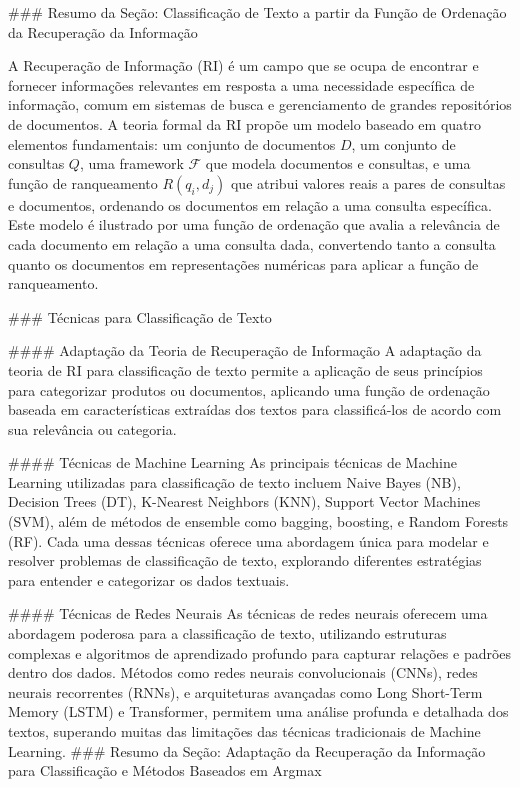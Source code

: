 {### Resumo da Seção: Classificação de Texto a partir da Função de Ordenação da Recuperação da Informação

A Recuperação de Informação (RI) é um campo que se ocupa de encontrar e fornecer informações relevantes em resposta a uma necessidade específica de informação, comum em sistemas de busca e gerenciamento de grandes repositórios de documentos. A teoria formal da RI propõe um modelo baseado em quatro elementos fundamentais: um conjunto de documentos \(D\), um conjunto de consultas \(Q\), uma framework \(\mathcal{F}\) que modela documentos e consultas, e uma função de ranqueamento \(R(q_i, d_j)\) que atribui valores reais a pares de consultas e documentos, ordenando os documentos em relação a uma consulta específica. Este modelo é ilustrado por uma função de ordenação que avalia a relevância de cada documento em relação a uma consulta dada, convertendo tanto a consulta quanto os documentos em representações numéricas para aplicar a função de ranqueamento.

### Técnicas para Classificação de Texto

#### Adaptação da Teoria de Recuperação de Informação
A adaptação da teoria de RI para classificação de texto permite a aplicação de seus princípios para categorizar produtos ou documentos, aplicando uma função de ordenação baseada em características extraídas dos textos para classificá-los de acordo com sua relevância ou categoria.

#### Técnicas de Machine Learning
As principais técnicas de Machine Learning utilizadas para classificação de texto incluem Naive Bayes (NB), Decision Trees (DT), K-Nearest Neighbors (KNN), Support Vector Machines (SVM), além de métodos de ensemble como bagging, boosting, e Random Forests (RF). Cada uma dessas técnicas oferece uma abordagem única para modelar e resolver problemas de classificação de texto, explorando diferentes estratégias para entender e categorizar os dados textuais.

#### Técnicas de Redes Neurais
As técnicas de redes neurais oferecem uma abordagem poderosa para a classificação de texto, utilizando estruturas complexas e algoritmos de aprendizado profundo para capturar relações e padrões dentro dos dados. Métodos como redes neurais convolucionais (CNNs), redes neurais recorrentes (RNNs), e arquiteturas avançadas como Long Short-Term Memory (LSTM) e Transformer, permitem uma análise profunda e detalhada dos textos, superando muitas das limitações das técnicas tradicionais de Machine Learning.
### Resumo da Seção: Adaptação da Recuperação da Informação para Classificação e Métodos Baseados em Argmax

}
